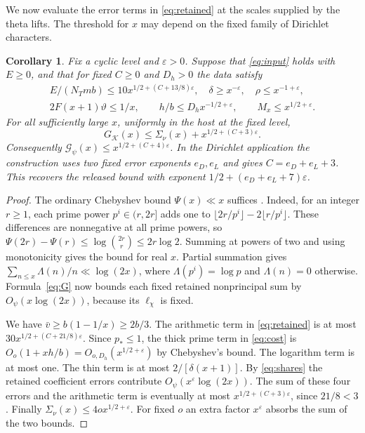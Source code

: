 \documentclass[11pt,letterpaper]{article}
\newcommand{\eps}{\varepsilon}
\newtheorem{corollary}[theorem]{Corollary}
\numberwithin{equation}{section}
\begin{document}
We now evaluate the error terms in \eqref{eq:retained} at the scales supplied by the theta lifts. The threshold for \(x\) may depend on the fixed family of Dirichlet characters.

\begin{corollary}\label{cor:source}
Fix a cyclic level and \(\eps>0\). Suppose that \eqref{eq:input} holds with \(E\ge0\), and that for fixed \(C\ge0\) and \(D_h>0\) the data satisfy
\begin{gather}
  E/(N_Tmb)\le 10x^{1/2+(C+13/8)\eps},\quad
  \delta\ge x^{-\eps},\quad \rho\le x^{-1+\eps},                         \label{eq:size}\\
  2F(x+1)\vartheta\le 1/x,\qquad
  h/b\le D_h x^{-1/2+\eps},\qquad M_x\le x^{1/2+\eps}.                 \label{eq:windows}
\end{gather}
For all sufficiently large \(x\), uniformly in the host at the fixed level,
\[
         G_{\mathcal K}(x)\le \Sigma_\nu(x)+x^{1/2+(C+3)\eps}.
\]
Consequently \(\mathcal G_\psi(x)\le x^{1/2+(C+4)\eps}\). In the Dirichlet application the construction uses two fixed error exponents \(e_D,e_L\) and gives \(C=e_D+e_L+3\). This recovers the released bound with exponent \(1/2+(e_D+e_L+7)\eps\).
\end{corollary}

\begin{proof}
The ordinary Chebyshev bound \(\Psi(x)\ll x\) suffices \cite[\S V, pp.~377--378]{cheb}. Indeed, for an integer \(r\ge1\), each prime power \(p^i\in(r,2r]\) adds one to \(\lfloor 2r/p^i\rfloor-2\lfloor r/p^i\rfloor\). These differences are nonnegative at all prime powers, so \(\Psi(2r)-\Psi(r)\le\log\binom{2r}{r}\le 2r\log2\). Summing at powers of two and using monotonicity gives the bound for real \(x\). Partial summation gives \(\sum_{n\le x}\Lambda(n)/n\ll\log(2x)\), where \(\Lambda(p^i)=\log p\) and \(\Lambda(n)=0\) otherwise. Formula~\eqref{eq:G} now bounds each fixed retained nonprincipal sum by \(O_\psi(x\log(2x))\), because its \(\ell_\chi\) is fixed.

We have \(\bar v\ge b(1-1/x)\ge2b/3\). The arithmetic term in \eqref{eq:retained} is at most \(30x^{1/2+(C+21/8)\eps}\). Since \(p_*\le1\), the thick prime term in \eqref{eq:cost} is \(O_o(1+xh/b)=O_{o,D_h}(x^{1/2+\eps})\) by Chebyshev's bound. The logarithm term is at most one. The thin term is at most \(2/[\delta(x+1)]\). By \eqref{eq:shares} the retained coefficient errors contribute \(O_\psi(x^\eps\log(2x))\). The sum of these four errors and the arithmetic term is eventually at most \(x^{1/2+(C+3)\eps}\), since \(21/8<3\). Finally \(\Sigma_\nu(x)\le 4o x^{1/2+\eps}\). For fixed \(o\) an extra factor \(x^\eps\) absorbs the sum of the two bounds.
\end{proof}
\end{document}
